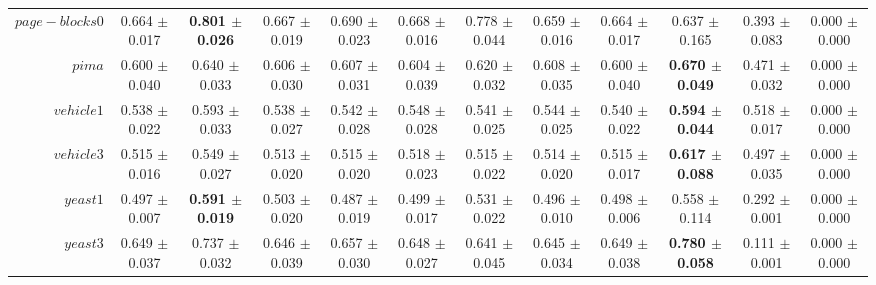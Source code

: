 \begin{table}[!ht]
{\begin{tabular}{r c c c c c c c c c c c}
$page-blocks0$ & 0.664 $\pm$ 0.017 & \textbf{0.801 $\pm$ 0.026} & 0.667 $\pm$ 0.019 & 0.690 $\pm$ 0.023 & 0.668 $\pm$ 0.016 & 0.778 $\pm$ 0.044 & 0.659 $\pm$ 0.016 & 0.664 $\pm$ 0.017 & 0.637 $\pm$ 0.165 & 0.393 $\pm$ 0.083 & 0.000 $\pm$ 0.000 \\
$pima$ & 0.600 $\pm$ 0.040 & 0.640 $\pm$ 0.033 & 0.606 $\pm$ 0.030 & 0.607 $\pm$ 0.031 & 0.604 $\pm$ 0.039 & 0.620 $\pm$ 0.032 & 0.608 $\pm$ 0.035 & 0.600 $\pm$ 0.040 & \textbf{0.670 $\pm$ 0.049} & 0.471 $\pm$ 0.032 & 0.000 $\pm$ 0.000 \\
$vehicle1$ & 0.538 $\pm$ 0.022 & 0.593 $\pm$ 0.033 & 0.538 $\pm$ 0.027 & 0.542 $\pm$ 0.028 & 0.548 $\pm$ 0.028 & 0.541 $\pm$ 0.025 & 0.544 $\pm$ 0.025 & 0.540 $\pm$ 0.022 & \textbf{0.594 $\pm$ 0.044} & 0.518 $\pm$ 0.017 & 0.000 $\pm$ 0.000 \\
$vehicle3$ & 0.515 $\pm$ 0.016 & 0.549 $\pm$ 0.027 & 0.513 $\pm$ 0.020 & 0.515 $\pm$ 0.020 & 0.518 $\pm$ 0.023 & 0.515 $\pm$ 0.022 & 0.514 $\pm$ 0.020 & 0.515 $\pm$ 0.017 & \textbf{0.617 $\pm$ 0.088} & 0.497 $\pm$ 0.035 & 0.000 $\pm$ 0.000 \\
$yeast1$ & 0.497 $\pm$ 0.007 & \textbf{0.591 $\pm$ 0.019} & 0.503 $\pm$ 0.020 & 0.487 $\pm$ 0.019 & 0.499 $\pm$ 0.017 & 0.531 $\pm$ 0.022 & 0.496 $\pm$ 0.010 & 0.498 $\pm$ 0.006 & 0.558 $\pm$ 0.114 & 0.292 $\pm$ 0.001 & 0.000 $\pm$ 0.000 \\
$yeast3$ & 0.649 $\pm$ 0.037 & 0.737 $\pm$ 0.032 & 0.646 $\pm$ 0.039 & 0.657 $\pm$ 0.030 & 0.648 $\pm$ 0.027 & 0.641 $\pm$ 0.045 & 0.645 $\pm$ 0.034 & 0.649 $\pm$ 0.038 & \textbf{0.780 $\pm$ 0.058} & 0.111 $\pm$ 0.001 & 0.000 $\pm$ 0.000 \\
\end{tabular}}
\end{table}
